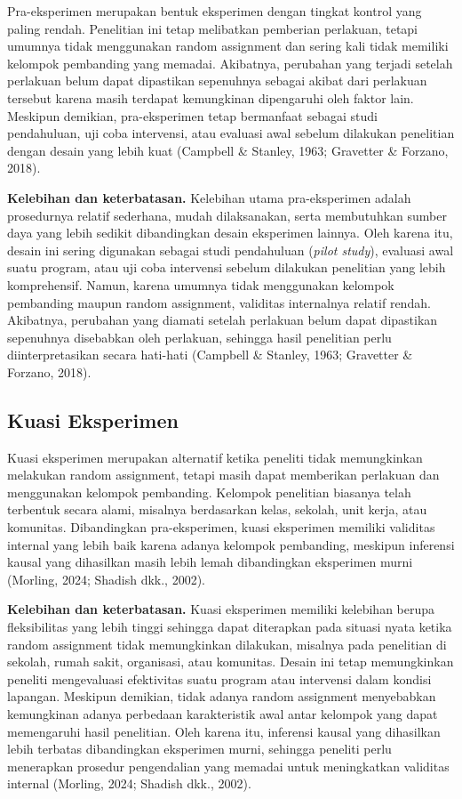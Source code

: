 \documentclass[
  indonesian,
  letterpaper,
  DIV=11,
  numbers=noendperiod]{scrreprt}
\begin{document}
Pra-eksperimen merupakan bentuk eksperimen dengan tingkat kontrol yang
paling rendah. Penelitian ini tetap melibatkan pemberian perlakuan,
tetapi umumnya tidak menggunakan random assignment dan sering kali tidak
memiliki kelompok pembanding yang memadai. Akibatnya, perubahan yang
terjadi setelah perlakuan belum dapat dipastikan sepenuhnya sebagai
akibat dari perlakuan tersebut karena masih terdapat kemungkinan
dipengaruhi oleh faktor lain. Meskipun demikian, pra-eksperimen tetap
bermanfaat sebagai studi pendahuluan, uji coba intervensi, atau evaluasi
awal sebelum dilakukan penelitian dengan desain yang lebih kuat
(Campbell \& Stanley, 1963; Gravetter \& Forzano, 2018).

\textbf{Kelebihan dan keterbatasan.} Kelebihan utama pra-eksperimen
adalah prosedurnya relatif sederhana, mudah dilaksanakan, serta
membutuhkan sumber daya yang lebih sedikit dibandingkan desain
eksperimen lainnya. Oleh karena itu, desain ini sering digunakan sebagai
studi pendahuluan (\emph{pilot study}), evaluasi awal suatu program,
atau uji coba intervensi sebelum dilakukan penelitian yang lebih
komprehensif. Namun, karena umumnya tidak menggunakan kelompok
pembanding maupun random assignment, validitas internalnya relatif
rendah. Akibatnya, perubahan yang diamati setelah perlakuan belum dapat
dipastikan sepenuhnya disebabkan oleh perlakuan, sehingga hasil
penelitian perlu diinterpretasikan secara hati-hati (Campbell \&
Stanley, 1963; Gravetter \& Forzano, 2018).

\subsection{Kuasi Eksperimen}\label{kuasi-eksperimen}

Kuasi eksperimen merupakan alternatif ketika peneliti tidak memungkinkan
melakukan random assignment, tetapi masih dapat memberikan perlakuan dan
menggunakan kelompok pembanding. Kelompok penelitian biasanya telah
terbentuk secara alami, misalnya berdasarkan kelas, sekolah, unit kerja,
atau komunitas. Dibandingkan pra-eksperimen, kuasi eksperimen memiliki
validitas internal yang lebih baik karena adanya kelompok pembanding,
meskipun inferensi kausal yang dihasilkan masih lebih lemah dibandingkan
eksperimen murni (Morling, 2024; Shadish dkk., 2002).

\textbf{Kelebihan dan keterbatasan.} Kuasi eksperimen memiliki kelebihan
berupa fleksibilitas yang lebih tinggi sehingga dapat diterapkan pada
situasi nyata ketika random assignment tidak memungkinkan dilakukan,
misalnya pada penelitian di sekolah, rumah sakit, organisasi, atau
komunitas. Desain ini tetap memungkinkan peneliti mengevaluasi
efektivitas suatu program atau intervensi dalam kondisi lapangan.
Meskipun demikian, tidak adanya random assignment menyebabkan
kemungkinan adanya perbedaan karakteristik awal antar kelompok yang
dapat memengaruhi hasil penelitian. Oleh karena itu, inferensi kausal
yang dihasilkan lebih terbatas dibandingkan eksperimen murni, sehingga
peneliti perlu menerapkan prosedur pengendalian yang memadai untuk
meningkatkan validitas internal (Morling, 2024; Shadish dkk., 2002).
\end{document}
